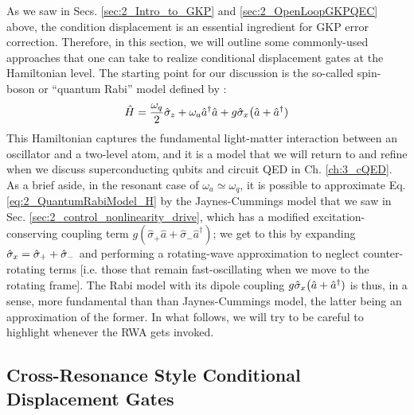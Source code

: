 As we saw in Secs. \ref{sec:2_Intro_to_GKP} and \ref{sec:2_OpenLoopGKPQEC} above, the condition displacement is an essential ingredient for GKP error correction. Therefore, in this section, we will  outline some commonly-used approaches that one can take to realize conditional displacement gates at the Hamiltonian level. The starting point for our discussion is the so-called spin-boson or ``quantum Rabi'' model defined by \cite{hagelstein2004introductory}:
\begin{equation}
\hat{H} = \frac{\omega_q}{2}\hat{\sigma}_z + \omega_a \hat{a}^\dagger \hat{a} + g\hat{\sigma}_x\big(\hat{a} + \hat{a}^\dagger)
\label{eq:2_QuantumRabiModel_H}
\end{equation}
This Hamiltonian captures the fundamental light-matter interaction between an oscillator and a two-level atom, and it is a model that we will return to and refine when we discuss superconducting qubits and circuit QED in Ch. \ref{ch:3_cQED}. As a brief aside, in the resonant case of $\omega_a \simeq \omega_q$, it is possible to approximate Eq. \eqref{eq:2_QuantumRabiModel_H} by the Jaynes-Cummings model that we saw in Sec. \ref{sec:2_control_nonlinearity_drive}, which has a modified excitation-conserving coupling term $g(\hat{\sigma}_+\hat{a} + \hat{\sigma}_-\hat{a}^\dagger)$; we get to this by expanding $\hat{\sigma}_x = \hat{\sigma}_+ + \hat{\sigma}_-$ and performing a rotating-wave approximation to neglect counter-rotating terms [i.e. those that remain fast-oscillating when we move to the rotating frame]. The Rabi model with its dipole coupling $g\hat{\sigma}_x\big(\hat{a} + \hat{a}^\dagger)$ is thus, in a sense, more fundamental than than Jaynes-Cummings model, the latter being an approximation of the former. In what follows, we will try to be careful to highlight whenever the RWA gets invoked.

\subsection{Cross-Resonance Style Conditional Displacement Gates}

